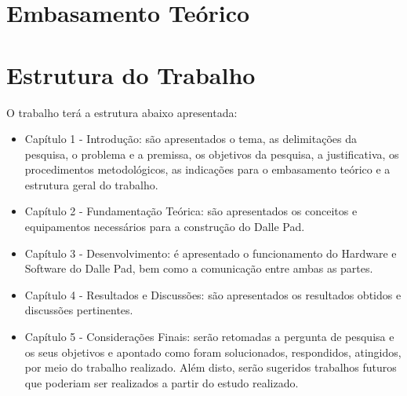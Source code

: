     \section{Embasamento Teórico}



    \section{Estrutura do Trabalho}

    O trabalho terá a estrutura abaixo apresentada:

    \begin{itemize}
      \item Capítulo 1 - Introdução: são apresentados o tema, as delimitações da pesquisa, o problema e a premissa, os objetivos da pesquisa, a justificativa, os procedimentos metodológicos, as indicações para o embasamento teórico e a estrutura geral do trabalho.

      \item Capítulo 2 - Fundamentação Teórica: são apresentados os conceitos e equipamentos necessários para a construção do Dalle Pad.

      \item Capítulo 3 - Desenvolvimento: é apresentado o funcionamento do Hardware e Software do Dalle Pad, bem como a comunicação entre ambas as partes.

      \item Capítulo 4 - Resultados e Discussões: são apresentados os resultados obtidos e discussões pertinentes.

      \item Capítulo 5 - Considerações Finais: serão retomadas a pergunta de pesquisa e os seus objetivos e apontado como foram solucionados, respondidos, atingidos, por meio do trabalho realizado. Além disto, serão sugeridos trabalhos futuros que poderiam ser realizados a partir do estudo realizado.
    \end{itemize} 